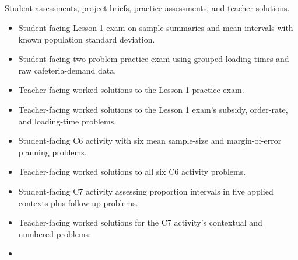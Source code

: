 \subsection{}

Student assessments, project briefs, practice assessments, and teacher solutions.

\begin{itemize}
  \item {}

  Student-facing Lesson 1 exam on sample summaries and mean intervals with known population standard deviation.

  \item {}

  Student-facing two-problem practice exam using grouped loading times and raw cafeteria-demand data.

  \item {}

  Teacher-facing worked solutions to the Lesson 1 practice exam.

  \item {}

  Teacher-facing worked solutions to the Lesson 1 exam's subsidy, order-rate, and loading-time problems.

  \item {}

  Student-facing C6 activity with six mean sample-size and margin-of-error planning problems.

  \item {}

  Teacher-facing worked solutions to all six C6 activity problems.

  \item {}

  Student-facing C7 activity assessing proportion intervals in five applied contexts plus follow-up problems.

  \item {}

  Teacher-facing worked solutions for the C7 activity's contextual and numbered problems.

  \item {}


\end{itemize}
